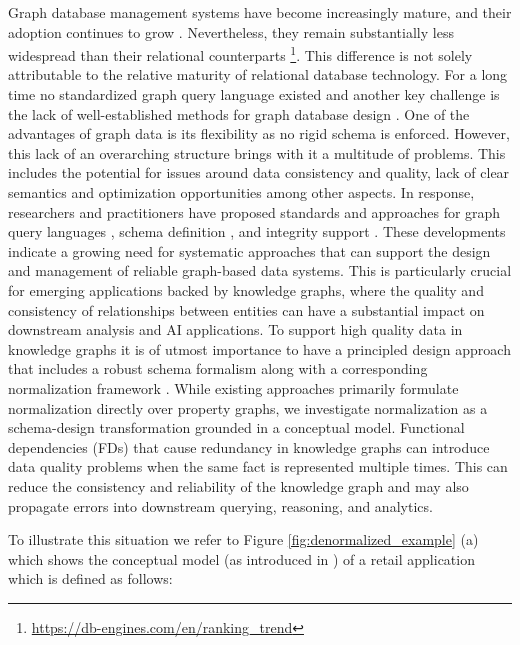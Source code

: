 \documentclass[sigconf]{acmart}
\begin{document}
Graph database management systems have become increasingly mature, and their adoption continues to grow \cite{Sakr_21_Future_is_Big_Graphs}. Nevertheless, they remain substantially less widespread than their relational counterparts \footnote{\url{https://db-engines.com/en/ranking_trend}}. This difference is not solely attributable to the relative maturity of relational database technology. For a long time no standardized graph query language existed and another key challenge is the lack of well-established methods for graph database design \cite{Pokorny_16_Conceptual_and_DB_Modeling_of_Graph_DBs}. One of the advantages of graph data is its flexibility as no rigid schema is enforced. However, this lack of an overarching structure brings with it a multitude of problems. This includes the potential for issues around data consistency and quality, lack of clear semantics and optimization opportunities among other aspects. In response, researchers and practitioners have proposed standards and approaches for graph query languages \cite{Angles_17_Foundations_Modern_Graph_Query_Languages, Angles_18_G-CORE, Deutsch_22_Graph_Pattern_Matching_GQL_SQL/PGQ}, schema definition \cite{Angles_23_PG_Schema}, and integrity support \cite{Angles_21_PG_Keys}. These developments indicate a growing need for systematic approaches that can support the design and management of reliable graph-based data systems. This is particularly crucial for emerging applications backed by knowledge graphs, where the quality and consistency of relationships between entities can have a substantial impact on downstream analysis and AI applications. To support high quality data in knowledge graphs it is of utmost importance to have a principled design approach that includes a robust schema formalism along with a corresponding normalization framework \cite{Skavantzos_25_Graph_3NF_BCNF, Egger_26_Structural_Normalization_of_PGs, Schrott_27_Graph_Native_Normalization}. While existing approaches primarily formulate normalization directly over property graphs, we investigate normalization as a schema-design transformation grounded in a conceptual model. Functional dependencies (FDs) that cause redundancy \cite{Kolahi_10_Analysis_of_Worst_Case_Redundancy} in knowledge graphs can introduce data quality problems when the same fact is represented multiple times. This can reduce the consistency and reliability of the knowledge graph and may also propagate errors into downstream querying, reasoning, and analytics.


To illustrate this situation we refer to Figure \ref{fig:denormalized_example} (a) which shows the conceptual model (as introduced in \cite{Thalheim_00_ERM}) of a retail application which is defined as follows:
\end{document}
